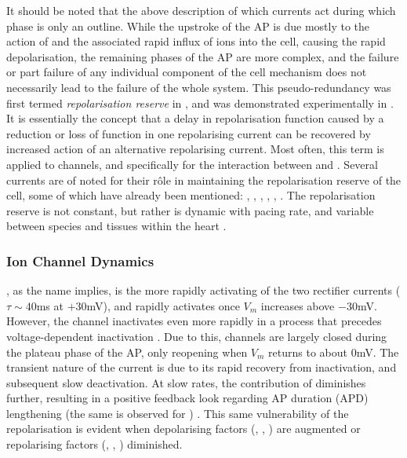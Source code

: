 \documentclass[../thesis-main.tex]{subfiles}
\begin{document}
 It should be noted that the above description of which currents act during which phase is only an outline. While the upstroke of the AP is due mostly to the action of \ina{} and the associated rapid influx of \na{} ions into the cell, causing the rapid depolarisation, the remaining phases of the AP are more complex, and the failure or part failure of any individual component of the cell mechanism does not necessarily lead to the failure of the whole system. This pseudo-redundancy was first termed \emph{repolarisation reserve} in \citet{Roden1998}, and was demonstrated experimentally in \citet{Varro2000}. It is essentially the concept that a delay in repolarisation function caused by a reduction or loss of function in one repolarising current can be recovered by increased action of an alternative repolarising current. Most often, this term is applied to \K{} channels, and specifically for the interaction between \ikr{} and \iks{} \citep{Xiao2008}. Several currents are of noted for their r\^ole in maintaining the repolarisation reserve of the cell, some of which have already been mentioned: \ikr{}, \iks{}, \ikix{}, \ito{}, \ica{}, \ina{} \citep{Varro2011}. The repolarisation reserve is not constant, but rather is dynamic with pacing rate, and variable between species and tissues within the heart \citep{Carmeliet2006}.
 
 \subsubsection{Ion Channel Dynamics}
 \label{subsubsec:channel-dynamics} 
 \ikr{}, as the name implies, is the more rapidly activating of the two rectifier \K{} currents ($\tau\sim40$ms at $+30$mV), and rapidly activates once $V_m$ increases above $-30$mV. However, the channel inactivates even more rapidly in a process that precedes voltage-dependent inactivation \citep{Varro2011, Spector1996, Carmeliet2006}. Due to this, \ikr{} channels are largely closed during the plateau phase of the AP, only reopening when $V_m$ returns to about 0mV. The transient nature of the current is due to its rapid recovery from inactivation, and subsequent slow deactivation. At slow rates, the contribution of \ikr{} diminishes further, resulting in a positive feedback look regarding AP duration (APD) lengthening (the same is observed for \ikix{}) \citep{Virag2009}. This same vulnerability of the repolarisation is evident when depolarising factors (\eg, \ina{}, \ica{}) are augmented or repolarising factors (\eg, \iks{}, \ikix{}) diminished.
 
\end{document}
